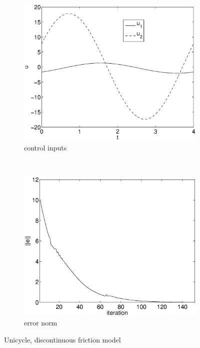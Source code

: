 \begin{figure}
\begin{subfigure}[b]{0.45\textwidth}
\centering
\includegraphics[width=\textwidth]{img/unicycle_u.eps}
\caption{control inputs}
\end{subfigure}
~
\begin{subfigure}[b]{0.45\textwidth}
\centering
\includegraphics[width=\textwidth]{img/unicycle_err.eps}
\caption{error norm}
\end{subfigure}
\caption{Unicycle, discontinuous friction model}
\label{fig:pr_uni}
\end{figure}